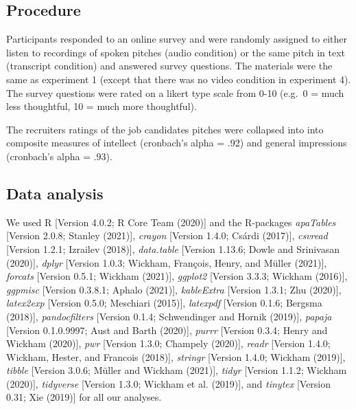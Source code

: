 \documentclass[
  english,
  man]{apa6}
\begin{document}
\hypertarget{procedure}{%
\subsection{Procedure}\label{procedure}}

Participants responded to an online survey and were randomly assigned to either listen to recordings of spoken pitches (audio condition) or the same pitch in text (transcript condition) and answered survey questions. The materials were the same as experiment 1 (except that there was no video condition in experiment 4). The survey questions were rated on a likert type scale from 0-10 (e.g.~0 = much less thoughtful, 10 = much more thoughtful).

The recruiters ratings of the job candidates pitches were collapsed into into composite measures of intellect (cronbach's alpha = .92) and general impressions (cronbach's alpha = .93).

\hypertarget{data-analysis}{%
\subsection{Data analysis}\label{data-analysis}}

We used R {[}Version 4.0.2; R Core Team (2020){]} and the R-packages \emph{apaTables} {[}Version 2.0.8; Stanley (2021){]}, \emph{crayon} {[}Version 1.4.0; Csárdi (2017){]}, \emph{csvread} {[}Version 1.2.1; Izrailev (2018){]}, \emph{data.table} {[}Version 1.13.6; Dowle and Srinivasan (2020){]}, \emph{dplyr} {[}Version 1.0.3; Wickham, François, Henry, and Müller (2021){]}, \emph{forcats} {[}Version 0.5.1; Wickham (2021){]}, \emph{ggplot2} {[}Version 3.3.3; Wickham (2016){]}, \emph{ggpmisc} {[}Version 0.3.8.1; Aphalo (2021){]}, \emph{kableExtra} {[}Version 1.3.1; Zhu (2020){]}, \emph{latex2exp} {[}Version 0.5.0; Meschiari (2015){]}, \emph{latexpdf} {[}Version 0.1.6; Bergsma (2018){]}, \emph{pandocfilters} {[}Version 0.1.4; Schwendinger and Hornik (2019){]}, \emph{papaja} {[}Version 0.1.0.9997; Aust and Barth (2020){]}, \emph{purrr} {[}Version 0.3.4; Henry and Wickham (2020){]}, \emph{pwr} {[}Version 1.3.0; Champely (2020){]}, \emph{readr} {[}Version 1.4.0; Wickham, Hester, and Francois (2018){]}, \emph{stringr} {[}Version 1.4.0; Wickham (2019){]}, \emph{tibble} {[}Version 3.0.6; Müller and Wickham (2021){]}, \emph{tidyr} {[}Version 1.1.2; Wickham (2020){]}, \emph{tidyverse} {[}Version 1.3.0; Wickham et al. (2019){]}, and \emph{tinytex} {[}Version 0.31; Xie (2019){]} for all our analyses.
\end{document}
